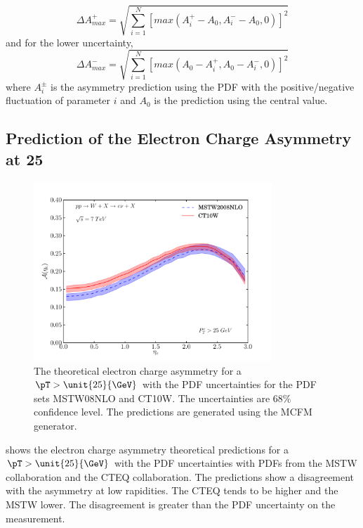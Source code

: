 \begin{equation}
\Delta A^{+}_{max}
= \sqrt{ \sum^{N}_{i=1} \left[ max( A^{+}_i-A_{0}, A^{-}_i-A_{0}, 0 ) \right]^{2}}
\end{equation}
and for the lower uncertainty,
\begin{equation}
\Delta A^{-}_{max}
= \sqrt{ \sum^{N}_{i=1} \left[ max( A_{0}-A^{+}_i, A_{0}-A^{-}_i, 0 ) \right]^{2}}
\end{equation}
where $A^{\pm}_{i}$ is the asymmetry prediction using the {PDF} with the
positive/negative fluctuation of parameter $i$ and $A_{0}$ is the prediction
using the central value.

\subsection{Prediction of the Electron Charge Asymmetry at \unit{25}{\GeV}}

\begin{figure}[htbp]
  \centering
  \includegraphics[width=0.8\textwidth]{asym-uncert}
  \caption{The theoretical electron charge
asymmetry\cite{monchenault2011predictions} for a $\pT>\unit{25}{\GeV}$ with the
{PDF} uncertainties for the {PDF} sets MSTW08NLO\cite{martin2009parton} and
CT10W\cite{lai2010vv}. The uncertainties are $68\%$ confidence level. The
predictions are generated using the {MCFM} \cite{campbellmcfm} generator.}
  \label{fig:asym-uncert}
\end{figure}

 shows the electron charge asymmetry theoretical
predictions for a $\pT>\unit{25}{\GeV}$ with the {PDF} uncertainties with PDFs
from the MSTW collaboration\cite{martin2009parton} and the CTEQ collaboration\cite{lai2010vv}.
The predictions show a disagreement with the asymmetry at low rapidities. The
CTEQ tends to be higher and the MSTW lower. The disagreement is greater than the
PDF uncertainty on the measurement.

